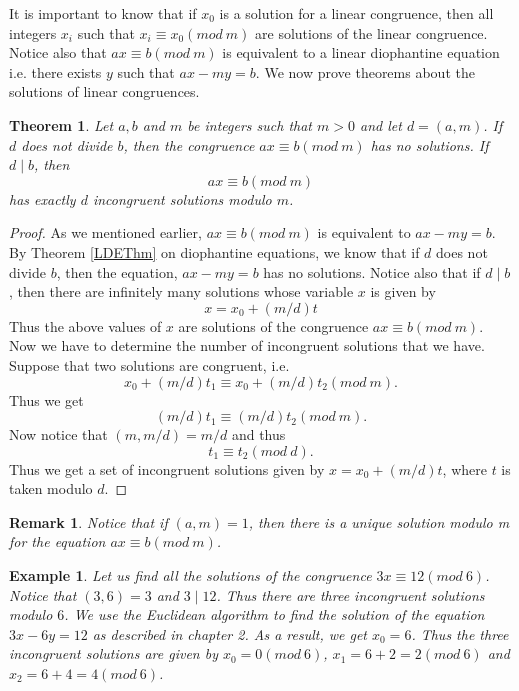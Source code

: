 \documentclass[12pt,letterpaper]{book}
\newtheorem{theorem}{Theorem}
\newtheorem{remark}{Remark}
\newtheorem{example}{Example}
\begin{document}
It is important to know that if $x_0$ is a solution for a linear
congruence, then all integers $x_i$ such that $x_i\equiv x_0 (mod \
m)$ are solutions of the linear congruence. Notice also that
$ax\equiv b (mod\ m)$ is equivalent to a linear diophantine equation
i.e. there exists $y$ such that $ax-my=b$.  We now prove theorems
about the solutions of linear congruences.

\begin{theorem}\label{LinCongThm}
Let $a,b$ and $m$ be integers such that $m>0$ and let $d=(a,m)$. If
$d$ does not divide $b$, then the congruence $ax\equiv b(mod \ m)$
has no solutions. If $d\mid b$, then
\begin{equation*}
ax\equiv b(mod \ m)
\end{equation*}
has exactly $d$ incongruent solutions modulo $m$.
\end{theorem}

\begin{proof}
As we mentioned earlier, $ax\equiv b(mod \ m)$ is equivalent to
$ax-my=b$.  By Theorem \ref{LDEThm} on diophantine equations, we know that if
$d$ does not divide $b$, then the equation, $ax-my=b$ has no
solutions. Notice also that if $d\mid b$, then there are infinitely
many solutions whose variable $x$ is given by
\begin{equation*}
x=x_0+(m/d)t
\end{equation*}
Thus the above values of $x$ are solutions of the congruence
$ax\equiv b(mod \ m)$.  Now we have to determine the number of
incongruent solutions that we have.  Suppose that two solutions are
congruent, i.e.
\begin{equation*}
x_0+(m/d)t_1\equiv x_0+(m/d)t_2(mod \ m).
\end{equation*}
Thus we get
\begin{equation*}
(m/d)t_1\equiv (m/d)t_2(mod \ m).
\end{equation*}
Now notice that $(m,m/d)=m/d$ and thus
\begin{equation*}
t_1\equiv t_2(mod \ d).
\end{equation*}
Thus we get a set of incongruent solutions given by $x=x_0+(m/d)t$,
where $t$ is taken modulo $d$.
\end{proof}

\begin{remark}
Notice that if $(a,m)=1$, then there is a unique solution modulo m
for the equation $ax\equiv b(mod \ m)$.
\end{remark}

\begin{example} Let us find all the solutions of the congruence $3x\equiv 12 (mod \
6)$.  Notice that $(3,6)=3$ and $3\mid 12$.  Thus there are three
incongruent solutions modulo $6$.  We use the Euclidean algorithm to
find the solution of the equation $3x-6y=12$ as described in chapter
2. As a result, we get $x_0=6$.  Thus the three incongruent
solutions are given by $x_0=0(mod \ 6)$, $x_1=6+2=2(mod \ 6)$ and
$x_2=6+4=4(mod \ 6)$.
\end{example}
\end{document}
